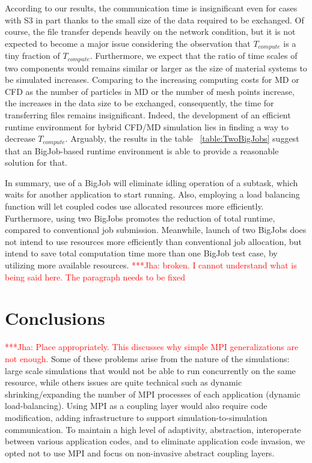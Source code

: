 \documentclass[conference,final]{IEEEtran}
\newcommand{\jhanote}[1]{ {\textcolor{red} { ***Jha: #1 }}}
\newcommand{\jhanote}[1]{}
\begin{document}
According to our results, the communication time is insignificant even for cases with S3 in part thanks to the small size of the data required to be exchanged.  Of course, the file transfer depends heavily on the network condition, but it is not expected to become a major issue considering the observation that ${T_{compute}}$ is a tiny fraction of  ${T_{compute}}$.  Furthermore, we expect that the ratio of time scales of two components would remains similar or larger as the size of material systems to be simulated increases.  Comparing to the increasing computing costs for MD or CFD as the number of particles in MD or the number of mesh points increase, the increases in the data size to be exchanged, consequently, the time for transferring files remains insignificant.  Indeed, the development of an efficient runtime environment for hybrid CFD/MD simulation lies in finding a way to decrease ${T_{compute}}$.  Arguably, the results in the table  ~\ref{table:TwoBigJobs} suggest that an BigJob-based runtime environment is able to provide a reasonable solution for that.  

In summary, use of a BigJob will eliminate idling operation of a
subtask, which waits for another application to start running. Also,
employing a load balancing function will let coupled codes use
allocated resources more efficiently. Furthermore, using two BigJobs
promotes the reduction of total runtime, compared to
conventional job submission. Meanwhile, launch of two BigJobs does not
intend to use resources more efficiently than conventional job
allocation, but intend to save total computation time more than one
BigJob test case, by utilizing more available resources. 
\jhanote{broken. I cannot understand what is being said
  here. The paragraph needs to be fixed}
  
  
\section{Conclusions}

\jhanote{Place appropriately. This discusses why simple MPI
  generalizations are not enough.} Some of these problems arise from
the nature of the simulations: large scale simulations that would not
be able to run concurrently on the same resource, while others issues
are quite technical such as dynamic shrinking/expanding the number of
MPI processes of each application (dynamic load-balancing). Using MPI
as a coupling layer would also require code modification, adding
infrastructure to support simulation-to-simulation communication. To
maintain a high level of adaptivity, abstraction, interoperate between
various application codes, and to eliminate application code invasion,
we opted not to use MPI and focus on non-invasive abstract coupling
layers.
\end{document}
